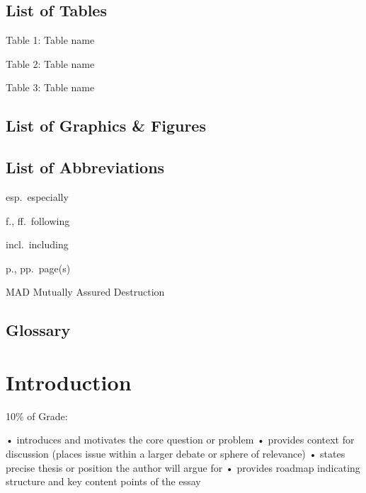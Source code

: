 \documentclass[12pt,a4paper]{book}      %
\begin{document}
\section*{List of Tables}\label{list-of-tables}


Table 1: Table name

Table 2: Table name

Table 3: Table name

\section*{List of Graphics \& Figures}\label{list-of-graphics-figures}


\section*{List of Abbreviations}\label{list-of-abbreviations}


esp.~especially

f., ff.~following

incl.~including

p., pp.~page(s)

MAD Mutually Assured Destruction

\section*{Glossary}\label{glossary}



\chapter{Introduction}\label{introduction}

10\% of Grade:

• introduces and motivates the core question or problem • provides
context for discussion (places issue within a larger debate or sphere of
relevance) • states precise thesis or position the author will argue for
• provides roadmap indicating structure and key content points of the
essay
\end{document}
